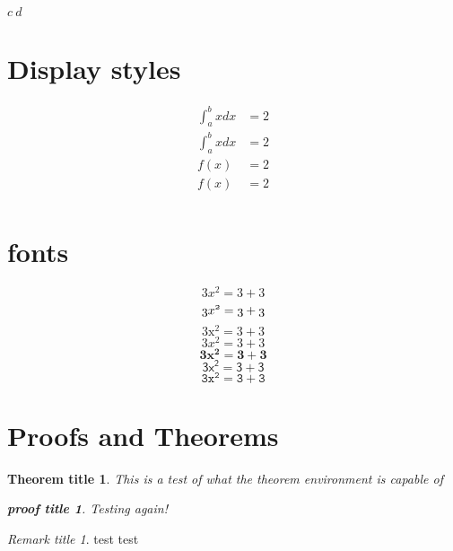 \documentclass[12pt]{report}
\begin{document}
$c~d$


\section{Display styles}

\begin{align*} 
\displaystyle \int_a^bxdx &= \displaystyle 2 \\
\textstyle \int_a^bxdx &= \textstyle 2\\ %
\scriptstyle f(x) &= \scriptstyle 2\\ %
\scriptscriptstyle f(x) &= \scriptscriptstyle 2\\ %
\end{align*}

\section{fonts}
$$3x^2 = 3 + 3$$ 
$$\mathnormal{3x^2 = 3 + 3}$$ %
$$\mathrm{3x^2 = 3 + 3}$$
$$\mathit{3x^2 = 3 + 3}$$
$$\mathbf{3x^2 = 3 + 3}$$
$$\mathsf{3x^2 = 3 + 3}$$
$$\mathtt{3x^2 = 3 + 3}$$

\section{Proofs and Theorems}
\theoremstyle{definition} %
\theoremstyle{plain} %
\newtheorem{mytheorem}{Theorem title}[section] %
\newtheorem{myproof}{proof title}[mytheorem] %

\theoremstyle{remark} %
\newtheorem*{remarks}{Remark title} %

\begin{mytheorem}
This is a test of what the theorem environment is capable of 
    \begin{myproof}
    Testing again! \qedsymbol 
    \end{myproof}
\end{mytheorem}

\begin{remarks}
test test
\end{remarks}

\end{document}
